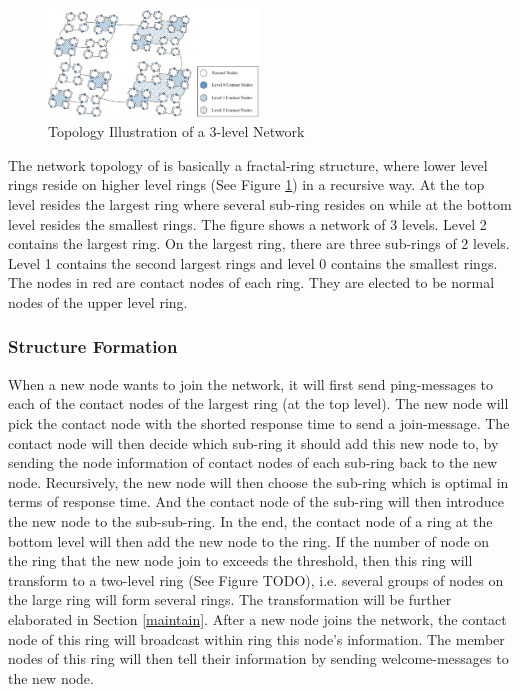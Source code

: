 \begin{figure}[t]
	\includegraphics[width=0.5\textwidth]{figures/topo.jpg}
	\caption{Topology Illustration of a 3-level \xxx Network}
	\label{fig:topo}
\end{figure}

The network topology of \xxx is basically a fractal-ring structure, where lower level rings reside on higher level rings (See Figure \ref{fig:topo}) in a recursive way. At the top level resides the largest ring where several sub-ring resides on while at the bottom level resides the smallest rings. The figure shows a network of 3 levels. Level 2 contains the largest ring. On the largest ring, there are three sub-rings of 2 levels. Level 1 contains the second largest rings and level 0 contains the smallest rings. The nodes in red are contact nodes of each ring. They are elected to be normal nodes of the upper level ring.

\subsubsection{Structure Formation} \label{formation}

When a new node wants to join the network, it will first send ping-messages to each of the contact nodes of the largest ring (at the top level). The new node will pick the contact node with the shorted response time to send a join-message. The contact node will then decide which sub-ring it should add this new node to, by sending the node information of contact nodes of each sub-ring back to the new node. Recursively, the new node will then choose the sub-ring which is optimal in terms of response time. And the contact node of the sub-ring will then introduce the new node to the sub-sub-ring. In the end, the contact node of a ring at the bottom level will then add the new node to the ring. If the number of node on the ring that the new node join to exceeds the threshold, then this ring will transform to a two-level ring (See Figure TODO), i.e. several groups of nodes on the large ring will form several rings. The transformation will be further elaborated in Section \cref{maintain}. After a new node joins the network, the contact node of this ring will broadcast within ring this node's information. The member nodes of this ring will then tell their information by sending welcome-messages to the new node.

